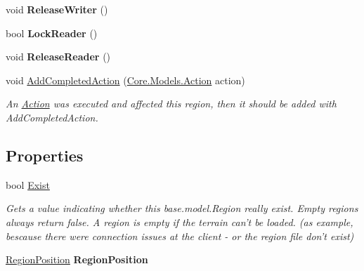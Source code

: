 \begin{DoxyCompactItemize}
\item 
\hypertarget{classCore_1_1Models_1_1Region_a377dbd594c64a01e00234efa9d91aa01}{void {\bfseries Release\-Writer} ()}\label{classCore_1_1Models_1_1Region_a377dbd594c64a01e00234efa9d91aa01}

\item 
\hypertarget{classCore_1_1Models_1_1Region_a33168014b3d76ef375e03fe123c6e172}{bool {\bfseries Lock\-Reader} ()}\label{classCore_1_1Models_1_1Region_a33168014b3d76ef375e03fe123c6e172}

\item 
\hypertarget{classCore_1_1Models_1_1Region_ab4fdcaab29033ad62ac611f74aeeab70}{void {\bfseries Release\-Reader} ()}\label{classCore_1_1Models_1_1Region_ab4fdcaab29033ad62ac611f74aeeab70}

\item 
void \hyperlink{classCore_1_1Models_1_1Region_a73612bd601b7c22498bb599e82e83cfb}{Add\-Completed\-Action} (\hyperlink{classCore_1_1Models_1_1Action}{Core.\-Models.\-Action} action)
\begin{DoxyCompactList}\small\item\em An \hyperlink{classCore_1_1Models_1_1Action}{Action} was executed and affected this region, then it should be added with Add\-Completed\-Action. \end{DoxyCompactList}\end{DoxyCompactItemize}
\subsection*{Properties}
\begin{DoxyCompactItemize}
\item 
bool \hyperlink{classCore_1_1Models_1_1Region_a8521c3cdb0ee6884d5e394217b44c66e}{Exist}
\begin{DoxyCompactList}\small\item\em Gets a value indicating whether this base.\-model.\-Region really exist. Empty regions always return false. A region is empty if the terrain can't be loaded. (as example, bescause there were connection issues at the client -\/ or the region file don't exist) \end{DoxyCompactList}\item 
\hypertarget{classCore_1_1Models_1_1Region_a2b370559aea0f72e9c2ee19dfcc7f7d8}{\hyperlink{classCore_1_1Models_1_1RegionPosition}{Region\-Position} {\bfseries Region\-Position}}\label{classCore_1_1Models_1_1Region_a2b370559aea0f72e9c2ee19dfcc7f7d8}

\end{DoxyCompactItemize}


